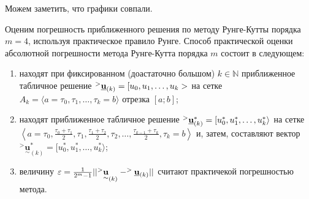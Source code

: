 \documentclass[14pt,a4paper]{scrartcl}
\begin{document}
\begin{figure}[H]
	\begin{minipage}[h]{1\linewidth}
	\end{minipage}
\end{figure}


Можем заметить, что графики совпали.


Оценим погрешность приближенного решения по методу Рунге-Кутты порядка $m=4$, используя практическое правило Рунге. Способ практической оценки абсолютной погрешности метода Рунге-Кутта порядка $m$ состоит в следующем:
\begin{enumerate}
	\item находят при фиксированном (доастаточно большом) $k \in \mathbb{N}$ приближенное табличное решение $^>\textbf{\underline{u}}_{(k)} = [u_0, u_1, \ldots, u_k>$ на сетке \\$A_k = \langle a=\tau_0, \tau_1, \ldots, \tau_k = b\rangle$ отрезка $[a;b]$; \\
	\item находят приближенное табличное решение $^>\textbf{\underline{u}}_{(k)}^* = [u_0^*, u_1^*, \ldots, u_k^*\rangle$ на сетке $\left\langle a=\tau_{0}, \frac{\tau_{0}+\tau_{1}}{2}, \tau_{1}, \frac{\tau_{1}+\tau_{2}}{2}, \tau_{2}, \ldots, \frac{\tau_{k-1}+\tau_{k}}{2}, \tau_{k}=b\right\rangle$ и, затем, составляют вектор\\ $^>\underset{\sim}{\textbf{u}}_{(k)}^* = [u_0^*, u_1^*, \ldots, u_k^*\rangle$;
	\item величину $\varepsilon = \frac{1}{2^m-1} || ^>\underset{\sim}{\textbf{u}}_{(k)} -  ^>\textbf{\underline{u}}_{(k)} ||$ считают практичекой погрешностью метода.
\end{enumerate}
\end{document}
